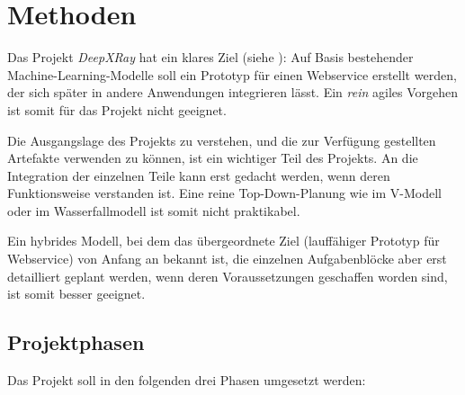 \section{Methoden}

Das Projekt \textit{DeepXRay} hat ein klares Ziel (siehe ): Auf Basis bestehender Machine-Learning-Modelle soll ein Prototyp für einen Webservice erstellt werden, der sich später in andere Anwendungen integrieren lässt. Ein \textit{rein} agiles Vorgehen ist somit für das Projekt nicht geeignet.

Die Ausgangslage des Projekts zu verstehen, und die zur Verfügung gestellten Artefakte verwenden zu können, ist ein wichtiger Teil des Projekts. An die Integration der einzelnen Teile kann erst gedacht werden, wenn deren Funktionsweise verstanden ist. Eine reine Top-Down-Planung wie im V-Modell oder im Wasserfallmodell ist somit nicht praktikabel.

Ein hybrides Modell, bei dem das übergeordnete Ziel (lauffähiger Prototyp für Webservice) von Anfang an bekannt ist, die einzelnen Aufgabenblöcke aber erst detailliert geplant werden, wenn deren Voraussetzungen geschaffen worden sind, ist somit besser geeignet.

\subsection{Projektphasen}
\label{sec:projektphasen}

Das Projekt soll in den folgenden drei Phasen umgesetzt werden:

